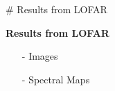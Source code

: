 \documentclass[aspectratio=169]{beamer}
\begin{document}
\begin{markdown}
# Results from LOFAR

\begin{frame}{}

\vspace*{1.5cm}

{\huge{\textbf{Results from LOFAR}}}

\begin{itemize}
    \item[-] \Large{Images}
    \item[-] \Large{Spectral Maps}
\end{itemize}

\end{frame}


\begin{frame}[plain]{}



\end{frame}
\end{markdown}
\end{document}
